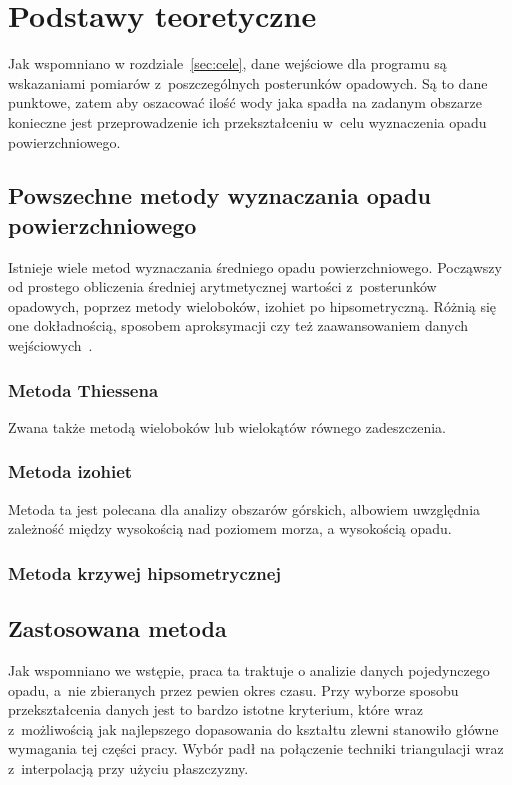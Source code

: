 \chapter{Podstawy teoretyczne}
Jak wspomniano w rozdziale~\ref{sec:cele}, dane wejściowe dla programu są wskazaniami pomiarów z~poszczególnych posterunków opadowych. Są to dane punktowe, zatem aby oszacować ilość wody jaka spadła na zadanym obszarze konieczne jest przeprowadzenie ich przekształceniu w~celu wyznaczenia opadu powierzchniowego.

\section{Powszechne metody wyznaczania opadu powierzchniowego}

Istnieje wiele metod wyznaczania średniego opadu powierzchniowego. Począwszy od prostego obliczenia średniej arytmetycznej wartości z~posterunków opadowych, poprzez metody wieloboków, izohiet po hipsometryczną. Różnią się one dokładnością, sposobem aproksymacji czy też zaawansowaniem danych wejściowych~\cite{opad_metody, obliczanie_opadu_sredniego}.

\subsection{Metoda Thiessena}
Zwana także metodą wieloboków lub wielokątów równego zadeszczenia.
\subsection{Metoda izohiet}

Metoda ta jest polecana dla analizy obszarów górskich, albowiem uwzględnia zależność między wysokością nad poziomem morza, a wysokością opadu.
\subsection{Metoda krzywej hipsometrycznej}

\section{Zastosowana metoda}
\label{sec:zastosowana_metoda}
Jak wspomniano we wstępie, praca ta traktuje o analizie danych pojedynczego opadu, a~nie zbieranych przez pewien okres czasu. Przy wyborze sposobu przekształcenia danych jest to bardzo istotne kryterium, które wraz z~możliwością jak najlepszego dopasowania do kształtu zlewni stanowiło główne wymagania tej części pracy. Wybór padł na połączenie techniki triangulacji wraz z~interpolacją przy użyciu płaszczyzny.

